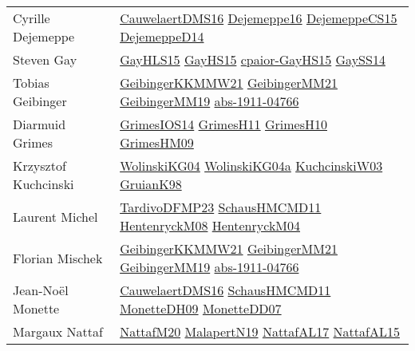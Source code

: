 {\begin{longtable}{p{4cm}p{20cm}}
Cyrille Dejemeppe & \href{papers/CauwelaertDMS16.pdf}{CauwelaertDMS16}\cite{CauwelaertDMS16} \href{}{Dejemeppe16}\cite{Dejemeppe16} \href{papers/DejemeppeCS15.pdf}{DejemeppeCS15}\cite{DejemeppeCS15} \href{papers/DejemeppeD14.pdf}{DejemeppeD14}\cite{DejemeppeD14} \\
Steven Gay & \href{papers/GayHLS15.pdf}{GayHLS15}\cite{GayHLS15} \href{papers/GayHS15.pdf}{GayHS15}\cite{GayHS15} \href{papers/cpaior-GayHS15.pdf}{cpaior-GayHS15}\cite{cpaior-GayHS15} \href{papers/GaySS14.pdf}{GaySS14}\cite{GaySS14} \\
Tobias Geibinger & \href{papers/GeibingerKKMMW21.pdf}{GeibingerKKMMW21}\cite{GeibingerKKMMW21} \href{papers/GeibingerMM21.pdf}{GeibingerMM21}\cite{GeibingerMM21} \href{papers/GeibingerMM19.pdf}{GeibingerMM19}\cite{GeibingerMM19} \href{articles/abs-1911-04766.pdf}{abs-1911-04766}\cite{abs-1911-04766} \\
Diarmuid Grimes & \href{articles/GrimesIOS14.pdf}{GrimesIOS14}\cite{GrimesIOS14} \href{papers/GrimesH11.pdf}{GrimesH11}\cite{GrimesH11} \href{papers/GrimesH10.pdf}{GrimesH10}\cite{GrimesH10} \href{papers/GrimesHM09.pdf}{GrimesHM09}\cite{GrimesHM09} \\
Krzysztof Kuchcinski & \href{papers/WolinskiKG04.pdf}{WolinskiKG04}\cite{WolinskiKG04} \href{}{WolinskiKG04a}\cite{WolinskiKG04a} \href{articles/KuchcinskiW03.pdf}{KuchcinskiW03}\cite{KuchcinskiW03} \href{papers/GruianK98.pdf}{GruianK98}\cite{GruianK98} \\
Laurent Michel & \href{papers/TardivoDFMP23.pdf}{TardivoDFMP23}\cite{TardivoDFMP23} \href{articles/SchausHMCMD11.pdf}{SchausHMCMD11}\cite{SchausHMCMD11} \href{papers/HentenryckM08.pdf}{HentenryckM08}\cite{HentenryckM08} \href{papers/HentenryckM04.pdf}{HentenryckM04}\cite{HentenryckM04} \\
Florian Mischek & \href{papers/GeibingerKKMMW21.pdf}{GeibingerKKMMW21}\cite{GeibingerKKMMW21} \href{papers/GeibingerMM21.pdf}{GeibingerMM21}\cite{GeibingerMM21} \href{papers/GeibingerMM19.pdf}{GeibingerMM19}\cite{GeibingerMM19} \href{articles/abs-1911-04766.pdf}{abs-1911-04766}\cite{abs-1911-04766} \\
Jean{-}No{\"{e}}l Monette & \href{papers/CauwelaertDMS16.pdf}{CauwelaertDMS16}\cite{CauwelaertDMS16} \href{articles/SchausHMCMD11.pdf}{SchausHMCMD11}\cite{SchausHMCMD11} \href{papers/MonetteDH09.pdf}{MonetteDH09}\cite{MonetteDH09} \href{papers/MonetteDD07.pdf}{MonetteDD07}\cite{MonetteDD07} \\
Margaux Nattaf & \href{papers/NattafM20.pdf}{NattafM20}\cite{NattafM20} \href{papers/MalapertN19.pdf}{MalapertN19}\cite{MalapertN19} \href{articles/NattafAL17.pdf}{NattafAL17}\cite{NattafAL17} \href{articles/NattafAL15.pdf}{NattafAL15}\cite{NattafAL15} \\

\end{longtable}}

